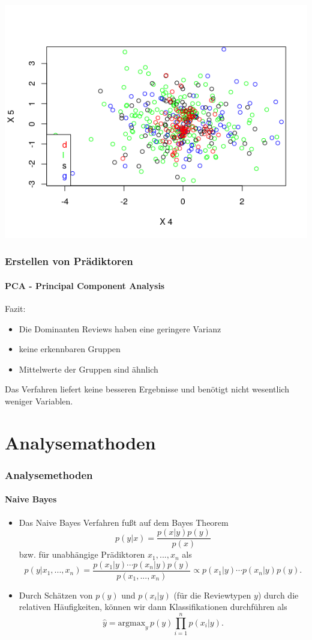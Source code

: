 \documentclass{beamer}
\begin{document}
\begin{frame}
 \includegraphics[scale=0.36]{PCA_4_5.png}
 
\end{frame}

\begin{frame}
 \frametitle{Erstellen von Prädiktoren}
 \framesubtitle{PCA - Principal Component Analysis}
 Fazit:
 \begin{itemize}
  \item Die Dominanten Reviews haben eine geringere Varianz
  \item keine erkennbaren Gruppen
  \item Mittelwerte der Gruppen sind ähnlich
 \end{itemize}
 
 Das Verfahren liefert keine besseren Ergebnisse und benötigt nicht wesentlich weniger Variablen. 

\end{frame}



\section{Analysemathoden}

\begin{frame}
\frametitle{Analysemethoden}
\framesubtitle{Naive Bayes}
\begin{itemize}\itemsep12pt
\item Das Naive Bayes Verfahren fußt auf dem Bayes Theorem
\[p(y|x) = \frac{p(x|y)p(y)}{p(x)}\]
bzw. für unabhängige Prädiktoren $x_1,...,x_n$ als
\[p(y|x_1,...,x_n)=\frac{p(x_1|y)\cdots p(x_n|y)p(y)}{p(x_1,...,x_n)}\propto p(x_1|y)\cdots p(x_n|y)p(y).\]
\item Durch Schätzen von $p(y)$ und $p(x_i|y)$ (für die Reviewtypen $y$) durch die relativen Häufigkeiten, können wir dann Klassifikationen durchführen als
\[\hat{y}=\text{argmax}_y\,p(y)\prod_{i=1}^np(x_i|y).\]
\end{itemize}
\end{frame}
\end{document}
